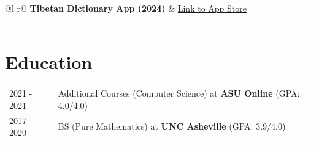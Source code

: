 \documentclass[a4paper,12pt]{article}
\begin{document}
\begin{tabularx}{\linewidth}{ @{}l r@{} }
\textbf{Tibetan Dictionary App (2024)} & \hfill \href{https://apps.apple.com/us/app/tibetan-dictionary/id6499481248}{Link to App Store} \\[3.75pt]
  \\
\end{tabularx}

\section{Education}
\begin{tabularx}{\linewidth}{@{}l X@{}}	
2021 - 2021 & Additional Courses (Computer Science) at \textbf{ASU Online} \hfill \normalsize (GPA: 4.0/4.0) \\

2017 - 2020 & BS (Pure Mathematics) at \textbf{UNC Asheville} \hfill (GPA: 3.9/4.0) \\ 

\end{tabularx}



\vfill
\end{document}
